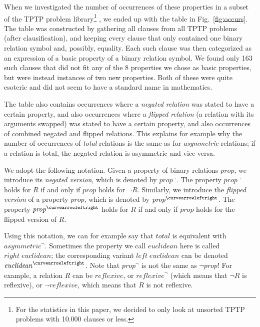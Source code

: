 \documentclass{article}
\newcommand{\Varid}[1]{\mathit{#1}}
\begin{document}
When we investigated the number of occurrences of these properties in a subset of the TPTP problem library\footnote{For the statistics in this paper, we decided to only look at unsorted TPTP problems with 10.000 clauses or less.} \cite{tptp}, we ended up with the table in Fig.\ \ref{fig:occurs}. The table was constructed by gathering all clauses from all TPTP problems (after clausification), and keeping every clause that only contained one binary relation symbol and, possibly, equality. Each such clause was then categorized as an expression of a basic property of a binary relation symbol. We found only 163 such clauses that did not fit any of the 8 properties we chose as basic properties, but were instead instances of two new properties. Both of these were quite esoteric and did not seem to have a standard name in mathematics.

The table also contains occurrences where a {\em negated relation} was stated to have a certain property, and also occurrences where a {\em flipped relation} (a relation with its arguments swapped) was stated to have a certain property, and also occurrences of combined negated and flipped relations. This explains for example why the number of occurrences of {\em total} relations is the same as for {\em asymmetric} relations; if a relation is total, the negated relation is asymmetric and vice-versa.

We adopt the following notation. Given a property of binary relations \ensuremath{\Varid{prop}}, we introduce its {\em negated version}, which is denoted by \ensuremath{\Varid{prop}^{\neg{}}}. The property \ensuremath{\Varid{prop}^{\neg{}}} holds for \ensuremath{R} if and only if \ensuremath{\Varid{prop}} holds for \ensuremath{\neg{}R}. Similarly, we introduce the {\em flipped version} of a property \ensuremath{\Varid{prop}}, which is denoted by \ensuremath{\Varid{prop}^{\curvearrowleftright}}. The property \ensuremath{\Varid{prop}^{\curvearrowleftright}} holds for \ensuremath{R} if and only if \ensuremath{\Varid{prop}} holds for the flipped version of \ensuremath{R}.

Using this notation, we can for example say that \ensuremath{\Varid{total}} is equivalent with \ensuremath{\Varid{asymmetric}^{\neg{}}}. Sometimes the property we call \ensuremath{\Varid{euclidean}} here is called \ensuremath{\Varid{right}\;\Varid{euclidean}}; the corresponding variant \ensuremath{\Varid{left}\;\Varid{euclidean}} can be denoted \ensuremath{\Varid{euclidean}^{\curvearrowleftright}}. Note that \ensuremath{\Varid{prop}^{\neg{}}} is not the same as \ensuremath{\neg{}\Varid{prop}}! For example, a relation \ensuremath{R} can be \ensuremath{\Varid{reflexive}}, or \ensuremath{\Varid{reflexive}^{\neg{}}} (which means that \ensuremath{\neg{}R} is reflexive), or \ensuremath{\neg{}\Varid{reflexive}}, which means that \ensuremath{R} is not reflexive.
\end{document}
